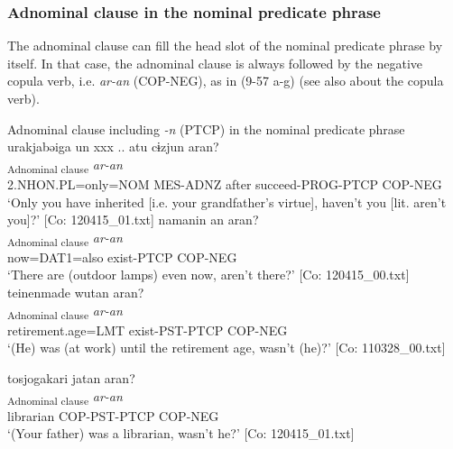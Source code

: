\subsubsection{Adnominal clause in the nominal predicate phrase}\label{sec:9.3.2.1}

The adnominal clause can fill the head slot of the nominal predicate phrase by itself. In that case, the adnominal clause is always followed by the negative copula verb, i.e. \textit{ar-an} (COP-NEG), as in (9-57 a-g) (see also  about the copula verb).

\ea   
\exi{} Adnominal clause including \textit{-n} (PTCP) in the nominal predicate phrase \label{ex:9.57}
\ea %
 \glll  urakjabəiga  un  xxx ..  atu   cɨzjun  aran?\\
      [\textit{urakja=bəi=ga}  \textit{u-n}    \textit{atu}  \textit{cɨg-tur-n}]\textsubscript{Adnominal clause}  \textit{ar-an}\\
      2.NHON.PL=only=NOM  MES-ADNZ    after  succeed-PROG-PTCP  COP-NEG\\
      \glt       ‘Only you have inherited [i.e. your grandfather’s virtue], haven’t you [lit. aren’t you]?’ [Co: 120415\_01.txt]
  \ex{}%
    \glll  namanin  an  aran?\\
      [\textit{nama=n=n}  \textit{ar-n}]\textsubscript{Adnominal clause}  \textit{ar-an}\\
      now=DAT1=also  exist-PTCP  COP-NEG\\
      \glt       ‘There are (outdoor lamps) even now, aren’t there?’ [Co: 120415\_00.txt]
\ex \label{ex:9.57c} %
    \glll  {\textbar}teinenmade{\textbar}  wutan  aran?\\
      [\textit{teinen=made}  \textit{wur-tar-n}]\textsubscript{Adnominal clause}\textbf{  }\textit{ar-an}\\
      retirement.age=LMT  exist-PST-PTCP  COP-NEG\\
      \glt       ‘(He) was (at work) until the retirement age, wasn’t (he)?’ [Co: 110328\_00.txt]

\ex \label{ex:9.57d} %
 \glll  {\textbar}tosjogakari{\textbar}  jatan  aran?\\
      [\textit{tasjogakari}  \textit{jar-tar-n}]\textsubscript{Adnominal clause}  \textit{ar-an}\\
      librarian  COP-PST-PTCP  COP-NEG\\
      \glt       ‘(Your father) was a librarian, wasn’t he?’ [Co: 120415\_01.txt]

